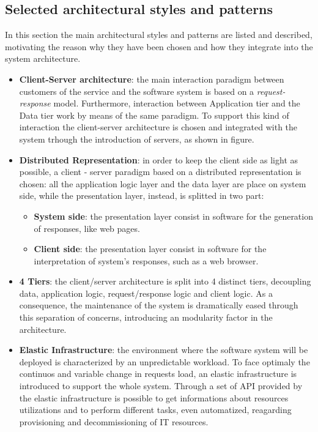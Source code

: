 \subsection{Selected architectural styles and patterns}

\label{sec:selected-styles-patterns}

In this section the main architectural styles and patterns are listed and described, motivating the reason why they have been chosen and how they integrate into the system architecture.

\begin{itemize}	
	\item \textbf{Client-Server architecture}: the main interaction paradigm between customers of the service and the software system is based on a \textit{request-response} model. Furthermore, interaction between Application tier and the Data tier work by means of the same paradigm. To support this kind of interaction the client-server architecture is chosen and integrated with the system trhough the introduction of servers, as shown in figure. 
	\item \textbf{Distributed Representation}: in order to keep the client side as light as possible, a client - server paradigm based on a distributed representation is chosen: all the application logic layer and the data layer are place on system side, while the presentation layer, instead, is splitted in two part:
	\begin{itemize}
		\item \textbf{System side}: the presentation layer consist in software for the generation of responses, like web pages.
		\item \textbf{Client side}: the presentation layer consist in software for the interpretation of system's responses, such as a web browser.
	\end{itemize}
	\item \textbf{4 Tiers}: the client/server architecture is split into 4 distinct tiers, decoupling data, application logic, request/response logic and client logic. As a consequence, the maintenance of the system is dramatically eased through this separation of concerns, introducing an modularity factor in the architecture.
	\item \textbf{Elastic Infrastructure}: the environment where the software system will be deployed is characterized by an unpredictable workload. To face optimaly the continuos and variable change in requests load, an elastic infrastructure is introduced to support the whole system. Through a set of API provided by the elastic infrastructure is possible to get informations about resources utilizations and to perform different tasks, even automatized, reagarding provisioning and decommissioning of IT resources.

\end{itemize}
